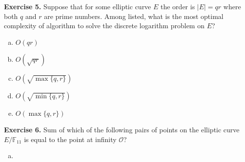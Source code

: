 \documentclass{zkdl-tests-template}
\begin{document}
\textbf{Exercise 5.} Suppose that for some elliptic curve $E$ the order is $|E| = qr$ where both $q$ and $r$ are prime numbers. Among listed, what is the most optimal complexity of algorithm to solve the discrete logarithm problem on $E$?
\begin{enumerate}[a)]
    \item $O(qr)$
    \item $O(\sqrt{qr})$
    \item $O(\sqrt{\max\{q,r\}})$
    \item $O(\sqrt{\min\{q,r\}})$
    \item $O(\max\{q,r\})$
\end{enumerate}

\textbf{Exercise 6.} Sum of which of the following pairs of points on the elliptic curve $E/\mathbb{F}_{11}$ is equal to the point at infinity $\mathcal{O}$?
\begin{enumerate}[a)]
    \item 
\end{enumerate}
\end{document}
